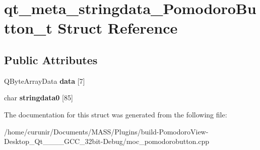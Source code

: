 \hypertarget{structqt__meta__stringdata___pomodoro_button__t}{}\section{qt\+\_\+meta\+\_\+stringdata\+\_\+\+Pomodoro\+Button\+\_\+t Struct Reference}
\label{structqt__meta__stringdata___pomodoro_button__t}
\subsection*{Public Attributes}
\begin{DoxyCompactItemize}
\item 
Q\+Byte\+Array\+Data {\bfseries data} \mbox{[}7\mbox{]}\hypertarget{structqt__meta__stringdata___pomodoro_button__t_a3dd2e0df6dec6c450c51fc6a05e9428a}{}\label{structqt__meta__stringdata___pomodoro_button__t_a3dd2e0df6dec6c450c51fc6a05e9428a}

\item 
char {\bfseries stringdata0} \mbox{[}85\mbox{]}\hypertarget{structqt__meta__stringdata___pomodoro_button__t_ae09552d59d8226a338af96b2ca404117}{}\label{structqt__meta__stringdata___pomodoro_button__t_ae09552d59d8226a338af96b2ca404117}

\end{DoxyCompactItemize}


The documentation for this struct was generated from the following file\+:\begin{DoxyCompactItemize}
\item 
/home/curunir/\+Documents/\+M\+A\+S\+S/\+Plugins/build-\/\+Pomodoro\+View-\/\+Desktop\+\_\+\+Qt\+\_\+\_\+\_\+\_\+\+G\+C\+C\+\_\+32bit-\/\+Debug/moc\+\_\+pomodorobutton.\+cpp\end{DoxyCompactItemize}
